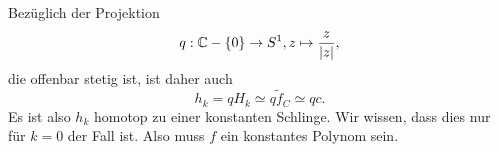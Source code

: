 \documentclass[a4paper,10pt]{article}
\begin{document}
Bezüglich der Projektion
\[
 q : \mathbb{C} - \{0\} \to S^1, z \mapsto \frac{z}{|z|},
\]
die offenbar stetig ist, ist daher auch
\[
 h_k = q H_k \simeq q \tilde{f}_C \simeq q c.
\]
Es ist also $h_k$ homotop zu einer konstanten Schlinge. Wir wissen, dass dies nur für $k = 0$ der Fall ist. Also muss $f$ ein konstantes Polynom sein.
\end{document}

